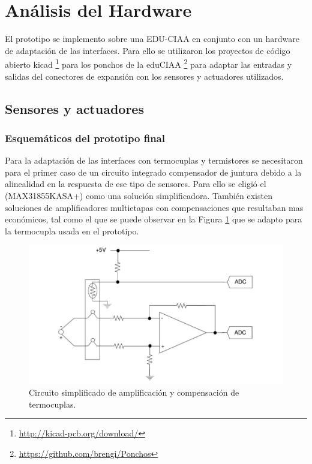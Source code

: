 \section{Análisis del Hardware}

El prototipo se implemento sobre una EDU-CIAA en conjunto con un hardware de adaptación de las interfaces. Para ello se utilizaron los proyectos de código abierto kicad \footnote{\url{http://kicad-pcb.org/download/}} para los ponchos de la eduCIAA \footnote{\url{https://github.com/brengi/Ponchos}} para adaptar las entradas y salidas del conectores de expansión con los sensores y actuadores utilizados. 

\subsection{Sensores y actuadores}

\subsubsection{Esquemáticos del prototipo final}
Para la adaptación de las interfaces con termocuplas y termistores se necesitaron para el primer caso de un circuito integrado compensador de juntura debido a la alinealidad en la respuesta de ese tipo de sensores. Para ello se eligió el (MAX31855KASA+) como una solución simplificadora. También existen soluciones de amplificadores multietapas con compensaciones que resultaban mas económicos, tal como el que se puede observar en la Figura \ref{fig:cirCompTermocupla} que se adapto para la termocupla usada en el prototipo.

\begin{figure}[h!]
	\centering
	\includegraphics[width=.7\textwidth]{Figures/Cap_3/circuito_ampl_termocupla}
	\caption{Circuito simplificado de amplificación y compensación de termocuplas.} \protect\footnotemark
	\label{fig:cirCompTermocupla}
\end{figure}

